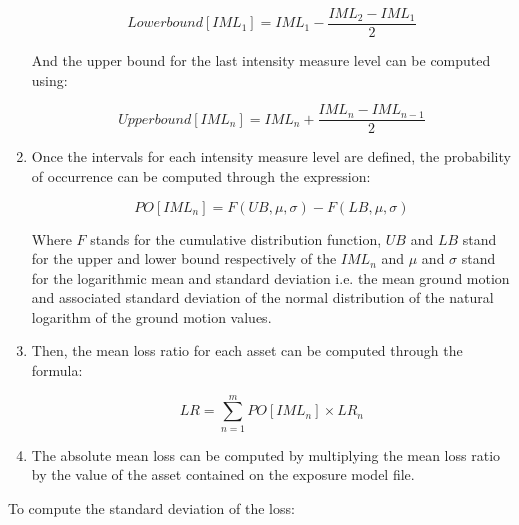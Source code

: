 \begin{enumerate}
\begin{equation}
Lower bound[IML_1]= IML_1-\frac{IML_2-IML_{1}}{2}
\end{equation}

And the upper bound for the last intensity measure level can be computed using:

\begin{equation}
Upper bound[IML_{n}]  = IML_{n}+\frac{IML_{n}-IML_{n-1}}{2}
\end{equation}

\item Once the intervals for each intensity measure level are defined, the probability of occurrence can be computed through the expression:

\begin{equation}
PO[IML_{n}]  = F(UB,\mu,\sigma)-F(LB,\mu,\sigma)
\end{equation}

Where $F$ stands for the cumulative distribution function, $UB$ and $LB$ stand for the upper and lower bound respectively of the $IML_n$ and $\mu$ and $\sigma$ stand for the logarithmic mean and standard deviation i.e. the mean ground motion and associated standard deviation of the normal distribution of the natural logarithm of the ground motion values.

\item Then, the mean loss ratio for each asset can be computed through the formula:

\begin{equation}
LR  = \sum_{n=1}^mPO[IML_n] \times LR_n
\end{equation}

\item The absolute mean loss can be computed by multiplying the mean loss ratio by the value of the asset contained on the exposure model file.

\end{enumerate}

To compute the standard deviation of the loss:

